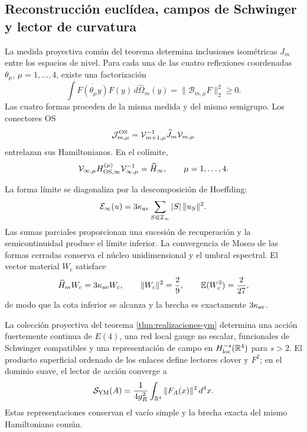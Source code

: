 \subsection*{Reconstrucción euclídea, campos de Schwinger y lector de curvatura}

La medida proyectiva común del teorema determina inclusiones isométricas
\(\widehat J_m\) entre los espacios de nivel. Para cada una de las cuatro
reflexiones coordenadas \(\theta_\mu\), \(\mu=1,\ldots,4\), existe una
factorización
\begin{equation}\label{eq:amp-ym-cuatro-os}
 \int\overline{F(\theta_\mu y)}F(y)\,
 d\widehat\Omega_m(y)
 =\|\mathcal B_{m,\mu}F\|_2^2\geq0.
\end{equation}
Las cuatro formas proceden de la misma medida y del mismo semigrupo. Los
conectores OS
\[
 \mathcal J_{m,\mu}^{\rm OS}
 =\mathcal V_{m+1,\mu}^{-1}\widehat J_m\mathcal V_{m,\mu}
\]
entrelazan sus Hamiltonianos. En el colímite,
\begin{equation}\label{eq:amp-ym-hamiltoniano-comun}
 \mathcal V_{\infty,\mu}H_{{\rm OS},\infty}^{(\mu)}
 \mathcal V_{\infty,\mu}^{-1}
 =\widehat H_\infty,
 \qquad \mu=1,\ldots,4.
\end{equation}

La forma límite se diagonaliza por la descomposición de Hoeffding:
\begin{equation}\label{eq:amp-ym-forma-limite}
 \mathcal E_\infty(u)=3\kappa_{\rm av}
 \sum_{S\Subset\mathcal I_\infty}|S|\,\|u_S\|^2.
\end{equation}
Las sumas parciales proporcionan una sucesión de recuperación y la
semicontinuidad produce el límite inferior. La convergencia de Mosco de las
formas cerradas conserva el núcleo unidimensional y el umbral espectral. El
vector material \(W_c\) satisface
\begin{equation}\label{eq:amp-ym-testigo-gap}
 \widehat H_mW_c=3\kappa_{\rm av}W_c,
 \qquad \|W_c\|^2=\frac29,
 \qquad \mathbb E(W_c^3)=\frac2{27},
\end{equation}
de modo que la cota inferior se alcanza y la brecha es exactamente
\(3\kappa_{\rm av}\).

\begin{theorem}
\label{thm:amp-ym-terminacion}
La colección proyectiva del teorema \ref{thm:realizaciones-ym} determina una
acción fuertemente continua de \(E(4)\), una red local gauge no escalar,
funcionales de Schwinger compatibles y una representación de campo en
\(H^{-s}_{\rm loc}(\mathbb R^4)\) para \(s>2\). El producto superficial
ordenado de los enlaces define lectores clover y \(F^2\); en el dominio
suave, el lector de acción converge a
\begin{equation}\label{eq:amp-ym-f2}
 \mathcal S_{\rm YM}(A)
 =\frac1{4g_R^2}\int_{\mathbb R^4}\|F_A(x)\|^2\,d^4x.
\end{equation}
Estas representaciones conservan el vacío simple y la brecha exacta del mismo
Hamiltoniano común.
\end{theorem}

